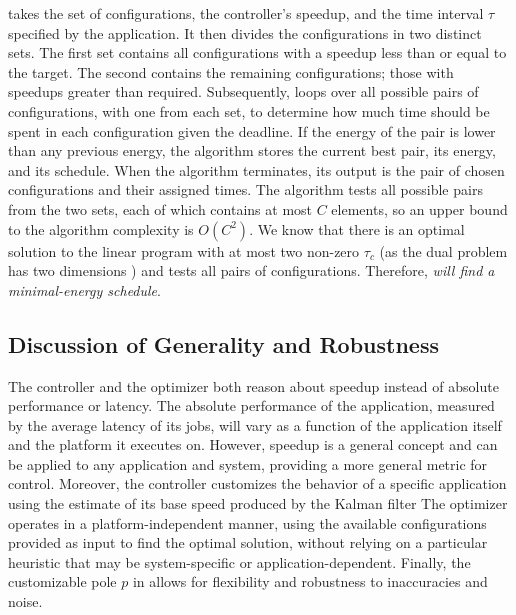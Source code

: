  takes the set of configurations, the controller's speedup, and the time interval $\tau$ specified by the application.
It then divides the configurations in two distinct sets.
The first set contains all configurations with a speedup less than or equal to the target.
The second contains the remaining configurations; \ie those with speedups greater than required.
Subsequently,  loops over all possible pairs of configurations, with one from each set, to determine how much time should be spent in each configuration given the deadline.
If the energy of the pair is lower than any previous energy, the algorithm stores the current best pair, its energy, and its schedule.
When the algorithm terminates, its output is the pair of chosen configurations and their assigned times.
The algorithm tests all possible pairs from the two sets, each of which contains at most $C$ elements, so an upper bound to the algorithm complexity is $O(C^2)$.
We know that there is an optimal solution to the linear program with at most two non-zero $\tau_c$ (as the dual problem has two dimensions \cite{LP}) and  tests all pairs of configurations.
Therefore, {\em {} will find a minimal-energy schedule}.


\subsection{Discussion of Generality and Robustness}
\label{sec:properties}

The controller and the optimizer both reason about speedup instead of absolute performance or latency.
The absolute performance of the application, measured by the average latency of its jobs, will vary as a function of the application itself and the platform it executes on.
However, speedup is a general concept and can be applied to any application and system, providing a more general metric for control.
Moreover, the controller customizes the behavior of a specific application using the estimate of its base speed produced by the Kalman filter
The optimizer operates in a platform-independent manner, using the available configurations provided as input to find the optimal solution, without relying on a particular heuristic that may be system-specific or application-dependent.
Finally, the customizable pole $p$ in  allows for flexibility and robustness to inaccuracies and noise.


